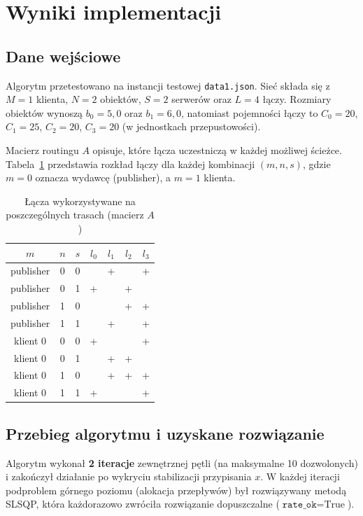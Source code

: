 \documentclass{article}
\begin{document}
\section{Wyniki implementacji}

\subsection{Dane wejściowe}

Algorytm przetestowano na instancji testowej \texttt{data1.json}.
Sieć składa się z $M=1$ klienta, $N=2$ obiektów, $S=2$ serwerów oraz $L=4$ łączy. Rozmiary obiektów wynoszą $b_0 = 5{,}0$ oraz $b_1 = 6{,}0$, natomiast pojemności łączy to $C_0 = 20$, $C_1 = 25$, $C_2 = 20$, $C_3 = 20$ (w jednostkach przepustowości).

Macierz routingu $A$ opisuje, które łącza uczestniczą w każdej możliwej ścieżce. Tabela~\ref{tab:routing} przedstawia rozkład łączy dla każdej kombinacji $(m, n, s)$, gdzie $m=0$ oznacza wydawcę (publisher), a $m=1$ klienta.

\begin{table}[h]
\centering
\caption{Łącza wykorzystywane na poszczególnych trasach (macierz $A$)}
\label{tab:routing}
\begin{tabular}{ccc|cccc}
\hline
$m$ & $n$ & $s$ & $l_0$ & $l_1$ & $l_2$ & $l_3$ \\
\hline
publisher & 0 & 0 &  & + &  & + \\
publisher & 0 & 1 & + &  & + &  \\
publisher & 1 & 0 &  &  & + & + \\
publisher & 1 & 1 &  & + &  & + \\
\hline
klient 0  & 0 & 0 & + &  &  & + \\
klient 0  & 0 & 1 &  & + & + &  \\
klient 0  & 1 & 0 &  & + & + & + \\
klient 0  & 1 & 1 & + &  &  & + \\
\hline
\end{tabular}
\end{table}

\subsection{Przebieg algorytmu i uzyskane rozwiązanie}

Algorytm wykonał \textbf{2 iteracje} zewnętrznej pętli (na maksymalne 10 dozwolonych) i zakończył działanie po wykryciu stabilizacji przypisania $x$. W każdej iteracji podproblem górnego poziomu (alokacja przepływów) był rozwiązywany metodą SLSQP, która każdorazowo zwróciła rozwiązanie dopuszczalne ($\texttt{rate\_ok} = \text{True}$).
\end{document}
